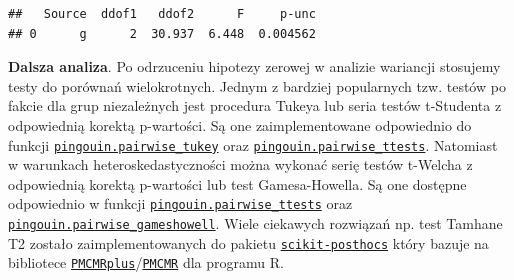 \documentclass[polish,]{book}
\begin{document}
\begin{verbatim}
##   Source  ddof1   ddof2      F     p-unc
## 0      g      2  30.937  6.448  0.004562
\end{verbatim}

\textbf{Dalsza analiza}. Po odrzuceniu hipotezy zerowej w analizie wariancji stosujemy testy do porównań wielokrotnych. Jednym z bardziej popularnych tzw. testów po fakcie dla grup niezależnych jest procedura Tukeya lub seria testów t-Studenta z odpowiednią korektą p-wartości. Są one zaimplementowane odpowiednio do funkcji
\href{https://pingouin-stats.org/generated/pingouin.pairwise_tukey.html\#pingouin.pairwise_tukey}{\texttt{pingouin.pairwise\_tukey}} oraz \href{https://pingouin-stats.org/generated/pingouin.pairwise_ttests.html\#pingouin.pairwise_ttests}{\texttt{pingouin.pairwise\_ttests}}. Natomiast w warunkach heteroskedastyczności można wykonać serię testów t-Welcha z odpowiednią korektą p-wartości lub test Gamesa-Howella. Są one dostępne odpowiednio w funkcji \href{https://pingouin-stats.org/generated/pingouin.pairwise_ttests.html\#pingouin.pairwise_ttests}{\texttt{pingouin.pairwise\_ttests}} oraz \href{https://pingouin-stats.org/generated/pingouin.pairwise_gameshowell.html\#pingouin.pairwise_gameshowell}{\texttt{pingouin.pairwise\_gameshowell}}. Wiele ciekawych rozwiązań np. test Tamhane T2 zostało zaimplementowanych do pakietu \href{https://scikit-posthocs.readthedocs.io/en/latest/}{\texttt{scikit-posthocs}} który bazuje na bibliotece \href{https://cran.r-project.org/web/packages/PMCMRplus/vignettes/QuickReferenceGuide.html}{\texttt{PMCMRplus}}/\href{https://cran.r-project.org/web/packages/PMCMR/vignettes/PMCMR.pdf}{\texttt{PMCMR}} dla programu R.
\end{document}
